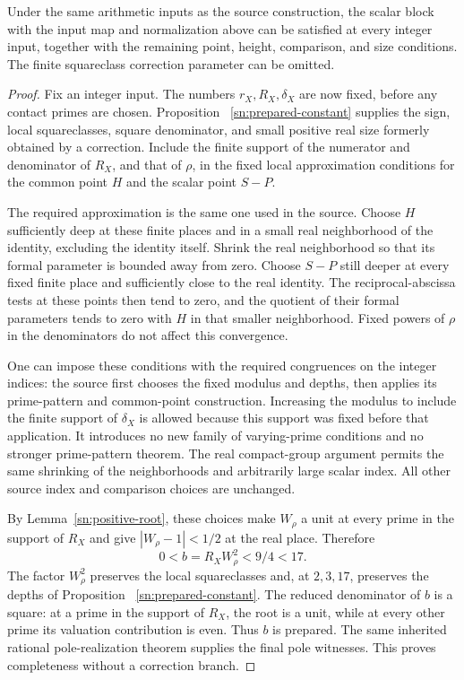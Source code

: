 \begin{proposition}\label{sn:simultaneous-completeness}
Under the same arithmetic inputs as the source construction,
the scalar block with the input map and normalization above
can be satisfied at every integer input, together with the
remaining point, height, comparison, and size conditions.
The finite squareclass correction parameter can be omitted.
\end{proposition}
\begin{proof}
Fix an integer input.  The numbers $r_X,R_X,\delta_X$ are
now fixed, before any contact primes are chosen.  Proposition~
\ref{sn:prepared-constant} supplies the sign, local squareclasses,
square denominator, and small positive real size formerly obtained
by a correction.  Include the finite support of the numerator
and denominator of $R_X$, and that of $\rho$, in the fixed
local approximation conditions for the common point $H$ and
the scalar point $S-P$.

The required approximation is the same one used in the source.
Choose $H$ sufficiently deep at these finite places and in a
small real neighborhood of the identity, excluding the identity
itself.  Shrink the real neighborhood so that its formal
parameter is bounded away from zero.  Choose $S-P$ still deeper
at every fixed finite place and sufficiently close to the real
identity.  The reciprocal-abscissa tests at these points then
tend to zero, and the quotient of their formal parameters
tends to zero with $H$ in that smaller neighborhood.
Fixed powers of $\rho$ in the denominators do not affect this
convergence.

One can impose these conditions with the required congruences
on the integer indices: the source first chooses the fixed
modulus and depths, then applies its prime-pattern and common-point
construction.  Increasing the modulus to include the finite
support of $\delta_X$ is allowed because this support was fixed
before that application.  It introduces no new family of
varying-prime conditions and no stronger prime-pattern theorem.
The real compact-group argument permits the same shrinking of
the neighborhoods and arbitrarily large scalar index.  All
other source index and comparison choices are unchanged.

By Lemma~\ref{sn:positive-root}, these choices make
$W_\rho$ a unit at every prime in the support of $R_X$ and
give $|W_\rho-1|<1/2$ at the real place.  Therefore
\[
                       0<b=R_XW_\rho^2<9/4<17.
\]
The factor $W_\rho^2$ preserves the local squareclasses and,
at $2,3,17$, preserves the depths of Proposition~
\ref{sn:prepared-constant}.  The reduced denominator of $b$
is a square: at a prime in the support of $R_X$, the root is
a unit, while at every other prime its valuation contribution
is even.  Thus $b$ is prepared.  The same inherited rational
pole-realization theorem supplies the final pole witnesses.
This proves completeness without a correction branch.
\end{proof}

